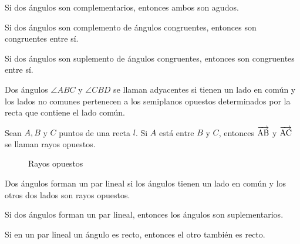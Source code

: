 \begin{theorem}
    Si dos ángulos son complementarios, entonces ambos son agudos.
\end{theorem}

\begin{theorem}
    Si dos ángulos son complemento de ángulos congruentes, entonces son congruentes entre sí.
\end{theorem}

\begin{theorem}
    Si dos ángulos son suplemento de ángulos congruentes, entonces son congruentes entre sí.
\end{theorem}

\begin{definition}
    Dos ángulos $\angle{ABC}$ y $\angle{CBD}$ se llaman adyacentes si tienen un lado en común y los lados no comunes pertenecen a los semiplanos opuestos determinados por la recta que contiene el lado común.
\end{definition}

\begin{definition}
    Sean $A,B$ y $C$ puntos de una recta $l$. Si $A$ está entre $B$ y $C$, entonces $\overrightarrow{\rm AB}$ y $\overrightarrow{\rm AC}$ se llaman rayos opuestos.

    \begin{figure}[!h]
        \centering
        
        \caption{Rayos opuestos}
        \label{fig:rayos-opuesto}
    \end{figure}
    
\end{definition}

\clearpage

\begin{definition}
    Dos ángulos forman un par lineal si los ángulos tienen un lado en común y los otros dos lados son rayos opuestos.

\end{definition}

\begin{postulate}
    Si dos ángulos forman un par lineal, entonces los ángulos son suplementarios.
\end{postulate}

\begin{theorem}
    Si en un par lineal un ángulo es recto, entonces el otro también es recto.
\end{theorem}

